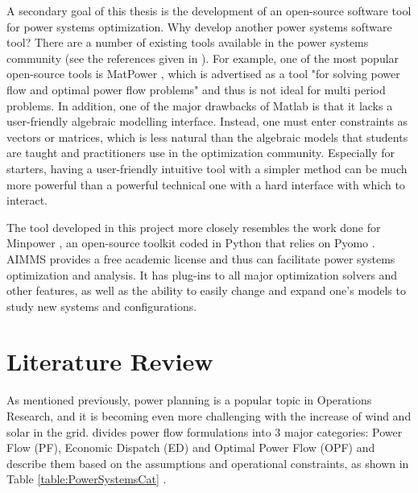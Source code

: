 \documentclass[12pt,LUDisStyle,twosided]{book}
\begin{document}
A secondary goal of this thesis is the development of an open-source software tool for power systems optimization. Why develop another power systems software tool? There are a number of existing tools available in the power systems community (see the references given in \cite{greenhall:2012}). For example, one of the most popular open-source tools is MatPower \cite{matpower:2011}, which is advertised as a tool "for solving power flow and optimal power flow problems" and thus is not ideal for multi period problems. In addition, one of the major drawbacks of Matlab is that it lacks a user-friendly algebraic modelling interface.  Instead, one must enter constraints as vectors or matrices, which is less natural than the algebraic models that students are taught and practitioners use in the optimization community. Especially for starters, having a user-friendly intuitive tool with a simpler method can be much more powerful than a powerful technical one with a hard interface with which to interact.

The tool developed in this project more closely resembles the work done for Minpower \cite{greenhall:2012},
an open-source toolkit coded in Python that relies on Pyomo \cite{pyomo:2012}. AIMMS provides a free academic license and thus can facilitate power systems optimization and analysis.
It has plug-ins to all major optimization solvers and other features, as well as the ability to easily change and expand one's models to study new systems and configurations.

\chapter{Literature Review}

As mentioned previously, power planning is a popular topic in Operations Research, and it is becoming even more challenging with the increase of wind and solar in the grid. \citeauthor{cain} \cite{cain} divides power flow formulations into 3 major categories: Power Flow (PF), Economic Dispatch (ED) and Optimal Power Flow (OPF) and describe them based on the assumptions and operational constraints, as shown in Table \ref{table:PowerSystemsCat} .
\end{document}
